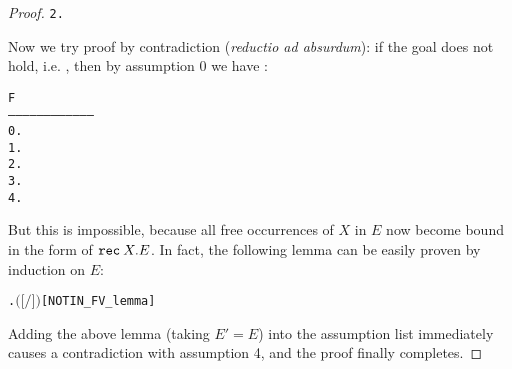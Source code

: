 \begin{proof}
\begin{alltt}
    2.  
\end{alltt}
Now we try proof by contradiction (\emph{reductio ad absurdum}): if
the goal does not hold, i.e.
, then by assumption 0 we have :
\begin{alltt}
        F
   ------------------------------------
    0.  
    1.  
    2.  
    3.  
    4.  
\end{alltt}
But this is impossible, because all free occurrences of $X$ in $E$ now become
bound in the form of ${\tt rec}\: X . E$. In fact, the following lemma can be
easily proven by induction on $E$:
\begin{alltt}
\HOLTokenTurnstile{} \HOLSymConst{\HOLTokenForall{}}  .  \HOLSymConst{\HOLTokenNotIn{}}  \ensuremath{(}\ensuremath{[}  \ensuremath{/}\ensuremath{]} \ensuremath{)}\hfill{[NOTIN_FV_lemma]}
\end{alltt}
Adding the above lemma (taking $E' = E$) into the assumption list immediately causes
a contradiction with assumption 4, and the proof finally completes.
\end{proof}

